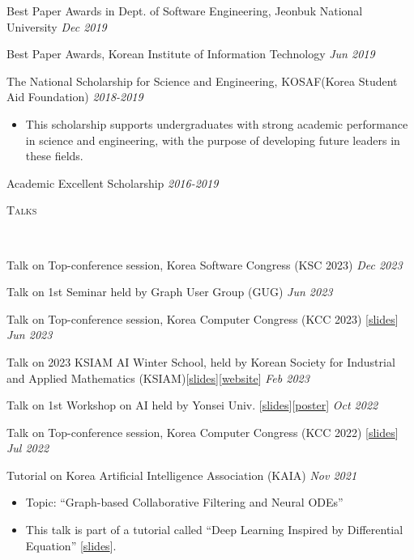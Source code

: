 \documentclass[10pt]{article}
\newenvironment{changemargin}[2]{
  \begin{list}{}{
    \setlength{\topsep}{0pt}
    \setlength{\leftmargin}{#1}
    \setlength{\rightmargin}{#2}
    \setlength{\listparindent}{\parindent}
    \setlength{\itemindent}{\parindent}
    \setlength{\parsep}{\parskip}
  }
  \item[]}{\end{list}
}
\newcommand{\lineover}{
	\begin{changemargin}{-0.05in}{-0.05in}
		\vspace*{-8pt}
		\hrulefill \\
		\vspace*{-2pt}
	\end{changemargin}
}
\newcommand{\header}[1]{
	\begin{changemargin}{-0.5in}{-0.5in}
		\scshape{#1}\\
  	\lineover
	\end{changemargin}
}
\newcommand{\award}[2]{
	{#1} \hfill \emph{#2}\\ \medskip
}
\newenvironment{body} {
	\vspace*{-16pt}
	\begin{changemargin}{-0.25in}{-0.5in}
  }
	{\end{changemargin}
}
\begin{document}
\begin{body}
\award{Best Paper Awards in Dept. of Software Engineering, Jeonbuk National University}{Dec 2019}
\award{Best Paper Awards, Korean Institute of Information Technology}{Jun 2019}
\award{The National Scholarship for Science and Engineering, KOSAF(Korea Student Aid Foundation)}{2018-2019}
    \begin{itemize} \itemsep -0pt  %
      \item This scholarship supports undergraduates with strong academic performance in science and engineering, with the purpose of developing future leaders in these fields.
  	\end{itemize}
\award{Academic Excellent Scholarship}{2016-2019}
\end{body}

\medskip
\header{Talks}

\begin{body}
	\vspace{14pt}
\award{Talk on Top-conference session, Korea Software Congress (KSC 2023)} {Dec 2023}
\award{Talk on 1st Seminar held by Graph User Group (GUG)}{Jun 2023}
\award{Talk on Top-conference session, Korea Computer Congress (KCC 2023) [\href{https://www.dropbox.com/s/34h6pmr7ftdiuzr/BSPM-KCC23.pptx?dl=0}{slides}]}{Jun 2023}
\award{Talk on 2023 KSIAM AI Winter School, held by Korean Society for Industrial and Applied Mathematics (KSIAM)[\href{https://www.dropbox.com/s/p4sd5h40hcuxcob/KSIAM23-Tutorial-ODE-RecSys.pdf?dl=0}{slides}][\href{https://ksiam.org/Conference/ConferenceView.asp?AC=3&CODE=CD20230101&CpPage=\#CONF}{website}]}{Feb 2023}
\award{Talk on 1st Workshop on AI held by Yonsei Univ. [\href{https://www.dropbox.com/s/9au5xx13qa2l529/AAAI22_workshop.pdf?dl=0}{slides}][\href{https://www.dropbox.com/s/pibzd51d76zy907/AAAI22-Yonsei_AI_Workshop.pdf?dl=0}{poster}]}{Oct 2022}
\award{Talk on Top-conference session, Korea Computer Congress (KCC 2022) [\href{https://www.dropbox.com/s/22d9d92ns8uv9qw/AAAI22_KCC22.pdf?dl=0}{slides}]}{Jul 2022}
\award{Tutorial on Korea Artificial Intelligence Association (KAIA)}{Nov 2021}
	\begin{itemize} \itemsep -0pt  %
        \item Topic: ``Graph-based Collaborative Filtering and Neural ODEs''
		\item This talk is part of a tutorial called ``Deep Learning Inspired by Differential Equation'' [\href{https://www.dropbox.com/s/1xn8xhd6llmhblz/%5BKAIA2021%5DTutorial-LT-OCF.pdf?dl=0}{slides}].
  	\end{itemize}
\end{body}
\end{document}
